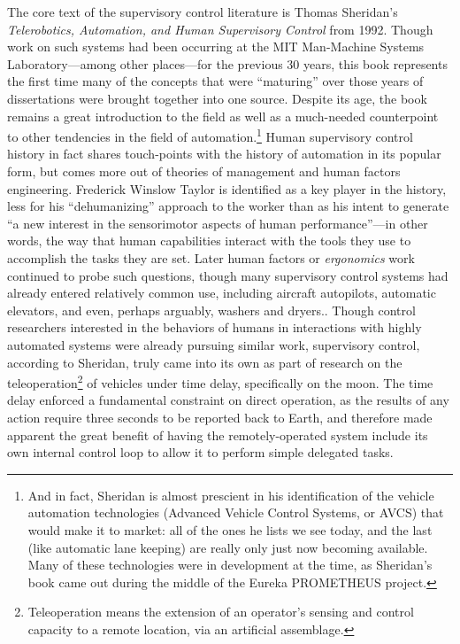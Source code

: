 The core text of the supervisory control literature is Thomas
Sheridan's \emph{Telerobotics, Automation, and Human Supervisory
  Control} from 1992. Though work on such systems had been occurring
at the MIT Man-Machine Systems Laboratory---among other places---for
the previous 30 years, this book represents the first time many of the
concepts that were ``maturing'' over those years of dissertations were
brought together into one source.\cite[p. xix]{sheridan} Despite its
age, the book remains a great introduction to the field as well as a
much-needed counterpoint to other tendencies in the field of
automation.\footnote{And in fact, Sheridan is almost prescient in his
  identification of the vehicle automation technologies (Advanced
  Vehicle Control Systems, or AVCS) that would
  make it to market: all of the ones he lists we see today, and the
  last (like automatic lane keeping) are really only just now becoming
  available. Many of these technologies were in development at the
  time, as Sheridan's book came out during the middle of the Eureka
  PROMETHEUS project.} Human supervisory control history in fact
shares touch-points with the history of automation in its popular
form, but comes more out of theories of management and human factors
engineering. Frederick Winslow Taylor is identified as a key player in
the history, less for his ``dehumanizing'' approach to the worker than
as
his intent to generate ``a new interest in the sensorimotor aspects of
human performance''---in other words, the way that human capabilities
interact with the tools they use to accomplish the tasks they are
set\cite[p. 7]{sheridan}. Later human factors or \emph{ergonomics}
work continued to probe such questions, though many supervisory
control systems had already entered relatively common use, including
aircraft autopilots, automatic elevators, and even, perhaps arguably,
washers and dryers.\cite[p. 8]{sheridan}. Though control researchers
interested in the behaviors of humans in interactions with highly
automated systems were already pursuing similar work, supervisory
control, according to Sheridan, truly came into its own as part of
research on the teleoperation\footnote{Teleoperation means the
  extension of an operator's sensing and control capacity to a remote
  location, via an artificial assemblage.\cite[p. 4]{sheridan}} of vehicles under time delay,
specifically on the moon. The time delay enforced a fundamental
constraint on direct operation, as the results of any action require
three seconds to be reported back to Earth, and therefore made
apparent the great benefit of having the remotely-operated system
include its own internal control loop to allow it to perform simple
delegated tasks.\cite[p. 9]{sheridan}

